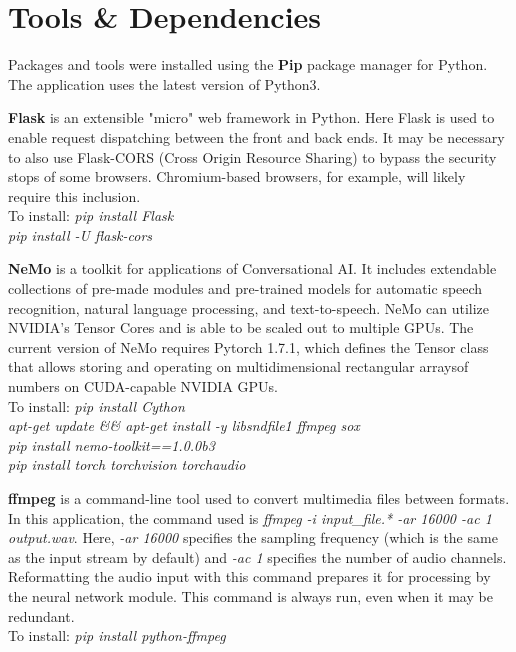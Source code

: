 \documentclass[12pt, letterpaper]{article}
\begin{document}
\section*{Tools \& Dependencies}
Packages and tools were installed using the \textbf{Pip} package manager for Python. 
\\The application uses the latest version of Python3.

\textbf{Flask} is an extensible "micro" web framework in Python. Here Flask is used to enable request dispatching between the front and back ends. It may be necessary to also use Flask-CORS (Cross Origin Resource Sharing) to bypass the security stops of some browsers. Chromium-based browsers, for example, will likely require this inclusion.
\\To install: \textit{pip install Flask}
\\\hspace*{19mm} \textit{pip install -U flask-cors}

\textbf{NeMo} is a toolkit for applications of Conversational AI. It includes extendable collections of pre-made modules and pre-trained models for automatic speech recognition, natural language processing, and text-to-speech. NeMo can utilize NVIDIA's Tensor Cores and is able to be scaled out to multiple GPUs. The current version of NeMo requires Pytorch 1.7.1, which defines the Tensor class that allows storing and operating on multidimensional rectangular arraysof numbers on CUDA-capable NVIDIA GPUs.
\\To install: \textit{pip install Cython}
\\\hspace*{19mm} \textit{apt-get update \&\& apt-get install -y libsndfile1 ffmpeg sox}
\\\hspace*{19mm} \textit{pip install nemo-toolkit==1.0.0b3}
\\\hspace*{19mm} \textit{pip install torch torchvision torchaudio}

\textbf{ffmpeg} is a command-line tool used to convert multimedia files between formats. In this application, the command used is \textit{ffmpeg -i input\_file.* -ar 16000 -ac 1 output.wav}. Here, \textit{-ar 16000} specifies the sampling frequency (which is the same as the input stream by default) and \textit{-ac 1} specifies the number of audio channels. Reformatting the audio input with this command prepares it for processing by the neural network module. This command is always run, even when it may be redundant.
\\To install: \textit{pip install python-ffmpeg}
\end{document}
